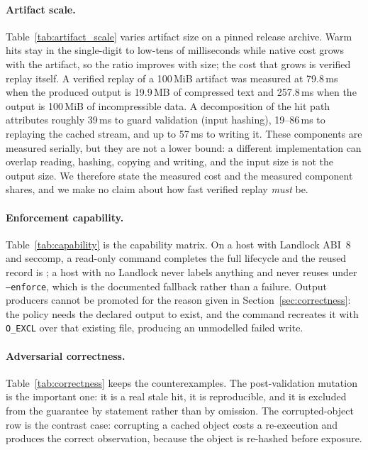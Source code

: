 

\paragraph{Artifact scale.}
Table~\ref{tab:artifact_scale} varies artifact size on a pinned release archive. Warm hits stay in
the single-digit to low-tens of milliseconds while native cost grows with the artifact, so the
ratio improves with size; the cost that grows is verified replay itself. A verified replay of a
100\,MiB artifact was measured at 79.8\,ms when the produced output is 19.9\,MB of compressed text
and 257.8\,ms when the output is 100\,MiB of incompressible data. A decomposition of the hit path
attributes roughly 39\,ms to guard validation (input hashing), 19--86\,ms to replaying the cached
stream, and up to 57\,ms to writing it. These components are measured serially, but they are not a
lower bound: a different implementation can overlap reading, hashing, copying and writing, and the
input size is not the output size. We therefore state the measured cost and the measured component
shares, and we make no claim about how fast verified replay \emph{must} be.



\paragraph{Enforcement capability.}
Table~\ref{tab:capability} is the capability matrix. On a host with Landlock ABI~8 and seccomp, a
read-only command completes the full lifecycle and the reused record is \proven{}; a host with no
Landlock never labels anything \proven{} and never reuses under \texttt{--enforce}, which is the
documented fallback rather than a failure. Output producers cannot be promoted for the reason given
in Section~\ref{sec:correctness}: the policy needs the declared output to exist, and the command
recreates it with \texttt{O\_EXCL} over that existing file, producing an unmodelled failed write.



\paragraph{Adversarial correctness.}
Table~\ref{tab:correctness} keeps the counterexamples. The post-validation mutation is the
important one: it is a real stale hit, it is reproducible, and it is excluded from the guarantee by
statement rather than by omission. The corrupted-object row is the contrast case: corrupting a
cached object costs a re-execution and produces the correct observation, because the object is
re-hashed before exposure.
